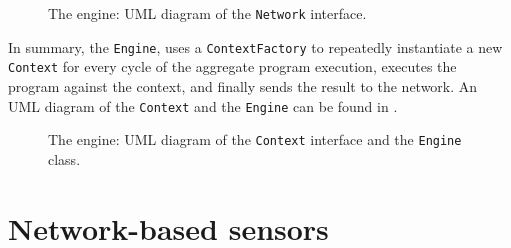 \begin{figure}
    \centering
    \caption{The engine: \ac{UML} diagram of the \texttt{Network} interface.}
    \label{fig:engine-network-diagram}
    \bigskip
    \resizebox{\linewidth}{!}{
        
    }
\end{figure}

In summary, the \texttt{Engine}, uses a \texttt{ContextFactory} to repeatedly instantiate a new \texttt{Context} for every cycle of the aggregate program execution, executes the program against the context, and finally sends the result to the network.
%
An \ac{UML} diagram of the \texttt{Context} and the \texttt{Engine} can be found in .

\begin{figure}
    \centering
    \caption{The engine: \ac{UML} diagram of the \texttt{Context} interface and the \texttt{Engine} class.}
    \label{fig:engine-diagram}
    \bigskip
    \resizebox{\linewidth}{!}{
        
    }
\end{figure}

\section{Network-based sensors} \label{chap:design->sec:network-based-sensors}


